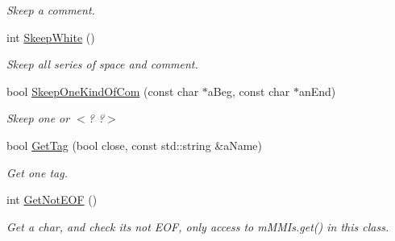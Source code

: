 \begin{DoxyCompactItemize}
\begin{DoxyCompactList}\small\item\em Skeep a comment. \end{DoxyCompactList}\item 
int \hyperlink{classMMVII_1_1cIXml__Ar2007_a7f59850fe4182d37d06d863e1fcc4c0e}{Skeep\+White} ()\hypertarget{classMMVII_1_1cIXml__Ar2007_a7f59850fe4182d37d06d863e1fcc4c0e}{}\label{classMMVII_1_1cIXml__Ar2007_a7f59850fe4182d37d06d863e1fcc4c0e}

\begin{DoxyCompactList}\small\item\em Skeep all series of space and comment. \end{DoxyCompactList}\item 
bool \hyperlink{classMMVII_1_1cIXml__Ar2007_aa4140d3d230ca18ff2e74b3dfc8e2f49}{Skeep\+One\+Kind\+Of\+Com} (const char $\ast$a\+Beg, const char $\ast$an\+End)\hypertarget{classMMVII_1_1cIXml__Ar2007_aa4140d3d230ca18ff2e74b3dfc8e2f49}{}\label{classMMVII_1_1cIXml__Ar2007_aa4140d3d230ca18ff2e74b3dfc8e2f49}

\begin{DoxyCompactList}\small\item\em Skeep one or $<$? ?$>$ \end{DoxyCompactList}\item 
bool \hyperlink{classMMVII_1_1cIXml__Ar2007_a4814e103cdf9d8cacaaa5729967446bd}{Get\+Tag} (bool close, const std\+::string \&a\+Name)\hypertarget{classMMVII_1_1cIXml__Ar2007_a4814e103cdf9d8cacaaa5729967446bd}{}\label{classMMVII_1_1cIXml__Ar2007_a4814e103cdf9d8cacaaa5729967446bd}

\begin{DoxyCompactList}\small\item\em Get one tag. \end{DoxyCompactList}\item 
int \hyperlink{classMMVII_1_1cIXml__Ar2007_ab4f2079638d39745f87f355a1b31fa42}{Get\+Not\+E\+OF} ()\hypertarget{classMMVII_1_1cIXml__Ar2007_ab4f2079638d39745f87f355a1b31fa42}{}\label{classMMVII_1_1cIXml__Ar2007_ab4f2079638d39745f87f355a1b31fa42}

\begin{DoxyCompactList}\small\item\em Get a char, and check its not E\+OF, only access to m\+M\+M\+Is.\+get() in this class. \end{DoxyCompactList}\end{DoxyCompactItemize}
